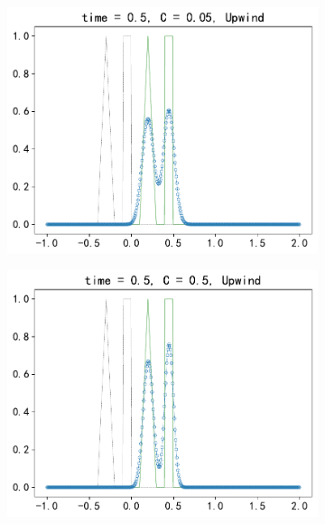 \documentclass[10.5pt
]{article}
\begin{document}
\begin{figure} 
\centering
\begin{subfigure}{.48\linewidth}
	\includegraphics[width=\textwidth]{figures/problem1_upwind0.05.pdf}
  \caption{}
  \label{fig:problem1-1}
\end{subfigure}
\hfill
\begin{subfigure}{.48\linewidth}
  \includegraphics[width=\textwidth]{figures/problem1_upwind0.5.pdf} %
  \caption{}
  \label{fig:problem1-2}
\end{subfigure}
\begin{subfigure}{.48\linewidth}

\end{subfigure}
\end{figure}
\end{document}

